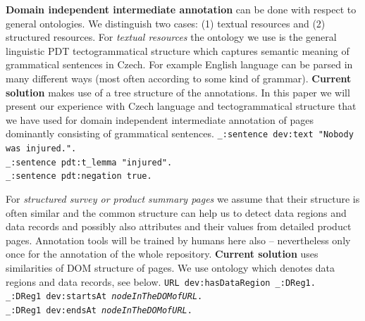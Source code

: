 \documentclass{www2009-submission}
\begin{document}
\textbf{Domain independent intermediate annotation} can be done with respect to general ontologies. We distinguish two cases: (1) textual resources and (2) structured resources. For \emph{textual resources} the ontology we use is the general linguistic PDT tectogrammatical structure \cite{biblio:zkraceno_MiBeAnnotationtectogrammatical2006} which captures semantic meaning of grammatical sentences in Czech. 
For example English language can be parsed in many different ways (most often according to some kind of grammar). {\bf Current solution} makes use of a tree structure of the annotations. In this paper we will present our experience with Czech language and tectogrammatical structure that we have used for domain independent intermediate annotation of pages dominantly consisting of grammatical sentences. 
\newline
\texttt{\phantom{mmm}\_:sentence dev:text "Nobody was injured.".\\
\phantom{mmm}\_:sentence pdt:t\_lemma "injured".\\
\phantom{mmm}\_:sentence pdt:negation true.}


For \emph{structured survey or product summary pages} we assume that their structure is often similar and the common structure can help us to detect data regions and data records and possibly also attributes and their values from detailed product pages. Annotation tools will be trained by humans here also -- nevertheless only once for the annotation of the whole repository. {\bf Current solution} uses similarities of DOM structure of pages. We use ontology which denotes data regions and data records, see below.
\newline
\texttt{\phantom{mmm}URL dev:hasDataRegion \_:DReg1.\\
\phantom{mmm}\_:DReg1 dev:startsAt \emph{nodeInTheDOMofURL}.\\
\phantom{mmm}\_:DReg1 dev:endsAt \emph{nodeInTheDOMofURL}.}


\end{document}

